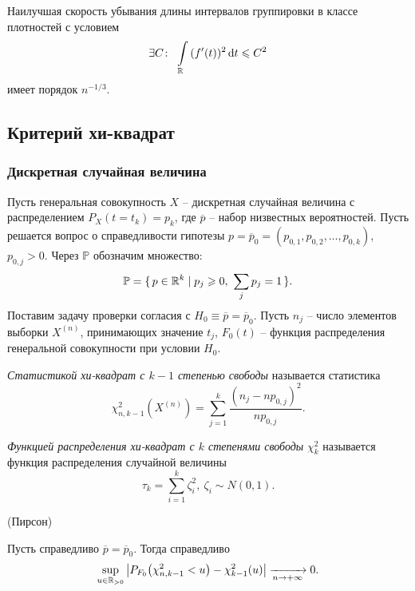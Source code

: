 \begin{theorem}
    Наилучшая скорость убывания длины интервалов группировки в классе плотностей
    с условием
    \[
        \exists C\colon~ \int\limits_{\mathbb{R}}{(f'(t))^2 \,\mathrm{d} t} \leqslant C^2
    \]
    имеет порядок $n^{-1/3}$.
\end{theorem}

\subsection{Критерий хи-квадрат}

\subsubsection{Дискретная случайная величина}
Пусть генеральная совокупность $X$ -- дискретная случайная величина с
распределением $P_X(t = t_k) = p_k$, где $\overline{p}$ -- набор низвестных
вероятностей. Пусть решается вопрос о справедливости гипотезы
$p = \overline{p}_0 = (p_{0, 1}, p_{0, 2}, \ldots, p_{0, k})$, $p_{0, j} > 0$.
Через $\mathbb{P}$ обозначим множество:
\[
    \mathbb{P} = \{\,p \in \mathbb{R}^k \mid p_j \geqslant 0,~ \sum_j{p_j} = 1 \,\}
.\]
Поставим задачу проверки согласия с $H_0 \equiv \overline{p} = \overline{p}_0$.
Пусть $n_j$ -- число элементов выборки $X^{(n)}$, принимающих значение $t_j$,
$F_0(t)$ -- функция распределения генеральной совокупности при условии $H_0$.

\begin{definition}
    \textit{Статистикой хи-квадрат с $k - 1$ степенью свободы} называется
    статистика
    \[
        \chi^2_{n, k - 1}(X^{(n)}) =
        \sum_{j = 1}^{k}{\frac{(n_j - n p_{0, j})^2}{np_{0, j}}}
    .\]
\end{definition}

\begin{definition}
    \textit{Функцией распределения хи-квадрат с $k$ степенями свободы}
    $\chi^2_{k}$ называется функция распределения случайной величины
    \[
        \tau_k = \sum_{i = 1}^k{\zeta^2_i},~ \zeta_i \sim N(0, 1)
    .\]
\end{definition}

\begin{theorem}(Пирсон)

    Пусть справедливо $\overline{p} = \overline{p}_0$. Тогда справедливо
    \[
        \sup_{u \in \R_{>0}}{\abs*{P_{F_0}\parens*{\chi^2_{n, k - 1} < u}
        - \chi^2_{k - 1}(u)}}
        \xrightarrow[n \to +\infty]{} 0
    .\]
\end{theorem}

